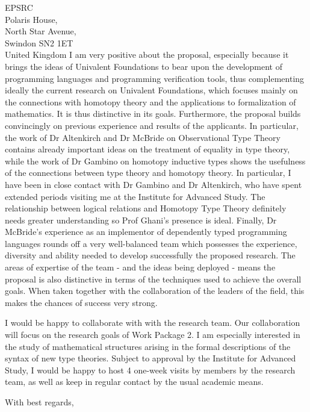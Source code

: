 \documentclass[10pt,a4paper,oneside]{iasletter}
\begin{document}
\begin{letter}{
EPSRC \\
Polaris House, \\
North Star Avenue, \\
Swindon SN2 1ET\\
United Kingdom}
I am very positive about the proposal, especially because it brings
the ideas of Univalent Foundations to bear upon the development of
programming languages and programming verification tools, thus
complementing ideally the current research on Univalent Foundations,
which focuses mainly on the connections with homotopy theory and the
applications to formalization of mathematics.  It is thus distinctive
in its goals. Furthermore, the proposal builds convincingly on
previous experience and results of the applicants. In particular, the
work of Dr Altenkirch and Dr McBride on Observational Type Theory
contains already important ideas on the treatment of equality in type
theory, while the work of Dr Gambino on homotopy inductive types shows
the usefulness of the connections between type theory and homotopy
theory. In particular, I have been in close contact with Dr Gambino
and Dr Altenkirch, who have spent extended periods visiting me at the
Institute for Advanced Study.  The relationship between logical
relations and Homotopy Type Theory definitely needs greater
understanding so Prof Ghani's presence is ideal. Finally, Dr McBride's
experience as an implementor of dependently typed programming
languages rounds off a very well-balanced team which possesses the
experience, diversity and ability needed to develop successfully the
proposed research. The areas of expertise of the team - and the ideas
being deployed - means the proposal is also distinctive in terms of
the techniques used to achieve the overall goals. When taken together
with the collaboration of the leaders of the field, this makes the
chances of success very strong.





 I would be happy to collaborate with with the
research team.  Our collaboration will focus on the
research goals of Work Package 2. I am especially interested in the study of mathematical  structures arising in the formal descriptions of the syntax of new type theories. 
Subject to approval by the Institute for Advanced Study, I would be happy
to host 4 one-week visits by members by the research team, as well as
keep in regular contact by the usual academic means.





\closing{With best regards,}

\end{letter}
\end{document}
